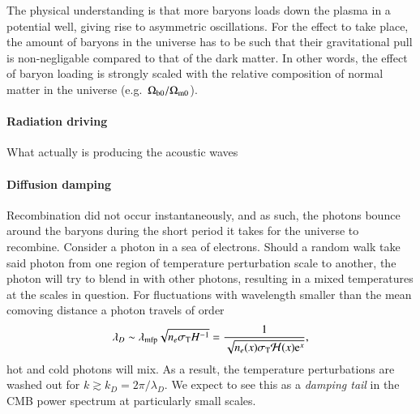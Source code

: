     The physical understanding is that more baryons loads down the plasma in a potential well, giving rise to asymmetric oscillations. For the effect to take place, the amount of baryons in the universe has to be such that their gravitational pull is non-negligable compared to that of the dark matter. In other words, the effect of baryon loading is strongly scaled with the relative composition of normal matter in the universe (e.g.~$\Omega_\mathrm{b0}/\Omega_{\mathrm{m}0}$).
    
    \paragraph{Radiation driving} 
    What actually is producing the acoustic waves
    


    \paragraph{Diffusion damping}
    Recombination did not occur instantaneously, and as such, the photons bounce around the baryons during the short period it takes for the universe to recombine. Consider a photon in a sea of electrons. Should a random walk take said photon from one region of temperature perturbation scale to another, the photon will try to blend in with other photons, resulting in a mixed temperatures at the scales in question. For fluctuations with wavelength smaller than the mean comoving distance a photon travels of order
    \begin{equation}
        \lambda_D \sim \lambda\ped{mfp}\sqrt{n_e\sigma\ped{T}H^{-1}} = \frac{1}{\sqrt{n_e(x)\sigma\ped{T}\Hp(x) \eu[x]}},
    \end{equation}
    hot and cold photons will mix. As a result, the temperature perturbations are washed out for $k\gtrsim  k_D = 2\pi/\lambda_D$. We expect to see this as a \textit{damping tail} in the CMB power spectrum at particularly small scales.


    

    



